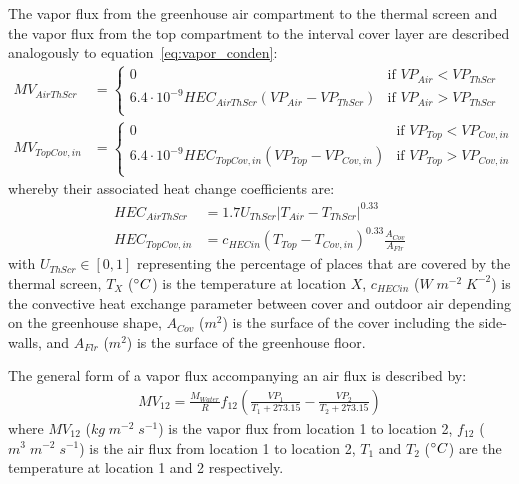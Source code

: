 \documentclass[a4paper]{article}
\begin{document}
The vapor flux from the greenhouse air compartment to the thermal screen and the vapor flux from the top compartment to the interval cover layer are described analogously to equation~\eqref{eq:vapor_conden}:
\begin{align}
  MV_{AirThScr}  & = \begin{cases}
    0                                                       & \text{if~} VP_{Air} < VP_{ThScr} \\
    6.4 \cdot 10^{-9} HEC_{AirThScr}(VP_{Air} - VP_{ThScr}) & \text{if~} VP_{Air} > VP_{ThScr} \\
  \end{cases}  \\
  MV_{TopCov,in} & = \begin{cases}
    0                                                         & \text{if~} VP_{Top} < VP_{Cov,in} \\
    6.4 \cdot 10^{-9} HEC_{TopCov,in}(VP_{Top} - VP_{Cov,in}) & \text{if~} VP_{Top} > VP_{Cov,in} \\
  \end{cases}
\end{align}
whereby their associated heat change coefficients are:
\begin{align}
  HEC_{AirThScr}  & = 1.7 U_{ThScr} |T_{Air} - T_{ThScr}|^{0.33}                        \\
  HEC_{TopCov,in} & = {c_{HECin} (T_{Top} - T_{Cov,in})}^{0.33} \frac{A_{Cov}}{A_{Flr}}
\end{align}
with \(U_{ThScr} \in [0,1]\) representing the percentage of places that are covered by the thermal screen, \(T_X\) (\(\degree C\)) is the temperature at location \(X\), \(c_{HECin}\) (\(W\;m^{-2}\;K^{-2}\)) is the convective heat exchange parameter between cover and outdoor air depending on the greenhouse shape, \(A_{Cov}\) (\(m^2\)) is the surface of the cover including the side-walls, and \(A_{Flr}\) (\(m^2\)) is the surface of the greenhouse floor.

The general form of a vapor flux accompanying an air flux is described by:
\begin{align}
  \label{eq:vapor_air}
  MV_{12} = \frac{M_{Water}}{R} f_{12} \left(\frac{VP_1}{T_1 + 273.15} - \frac{VP_2}{T_2 + 273.15}\right)
\end{align}
where \(MV_{12}\) (\(kg\;m^{-2}\;s^{-1}\)) is the vapor flux from location 1 to location 2, \(f_{12}\) (\(m^3\;m^{-2}\;s^{-1}\)) is the air flux from location 1 to location 2, \(T_1\) and \(T_2\) (\(\degree C\)) are the temperature at location 1 and 2 respectively.
\end{document}
